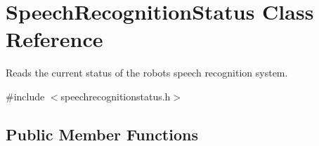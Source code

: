 \hypertarget{class_speech_recognition_status}{}\section{Speech\+Recognition\+Status Class Reference}
\label{class_speech_recognition_status}


Reads the current status of the robot\textquotesingle{}s speech recognition system.  




{\ttfamily \#include $<$speechrecognitionstatus.\+h$>$}

\subsection*{Public Member Functions}
